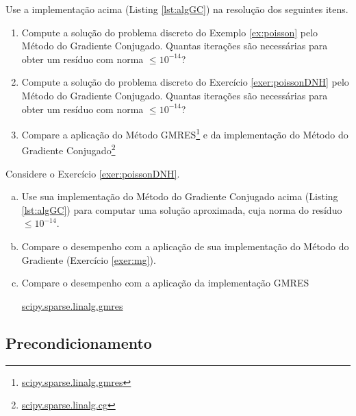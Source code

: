 \begin{exer}\label{exer:mgc}
  Use a implementação acima (Listing \ref{lst:algGC}) na resolução dos seguintes itens.
  \begin{enumerate}
  \item Compute a solução do problema discreto do Exemplo \ref{ex:poisson} pelo Método do Gradiente Conjugado. Quantas iterações são necessárias para obter um resíduo com norma $\leq 10^{-14}$?
  \item Compute a solução do problema discreto do Exercício \ref{exer:poissonDNH} pelo Método do Gradiente Conjugado. Quantas iterações são necessárias para obter um resíduo com norma $\leq 10^{-14}$?
  \item Compare a aplicação do Método GMRES\footnote{\href{https://docs.scipy.org/doc/scipy/reference/generated/scipy.sparse.linalg.gmres.html}{scipy.sparse.linalg.gmres}} e da implementação {\scipy} do Método do Gradiente Conjugado\footnote{\href{https://docs.scipy.org/doc/scipy/reference/generated/scipy.sparse.linalg.cg.html}{scipy.sparse.linalg.cg}}
  \end{enumerate}
\end{exer}

\begin{exer}
  Considere o Exercício \ref{exer:poissonDNH}.
  \begin{enumerate}[a)]
  \item Use sua implementação do Método do Gradiente Conjugado acima (Listing \ref{lst:algGC}) para computar uma solução aproximada, cuja norma do resíduo $\leq 10^{-14}$.
  \item Compare o desempenho com a aplicação de sua implementação do Método do Gradiente (Exercício \ref{exer:mg}).
  \item Compare o desempenho com a aplicação da implementação GMRES
    \begin{center}
      \href{https://docs.scipy.org/doc/scipy/reference/generated/scipy.sparse.linalg.gmres.html}{scipy.sparse.linalg.gmres}
    \end{center}
  \end{enumerate}
\end{exer}

\subsection{Precondicionamento}

\emconstrucao